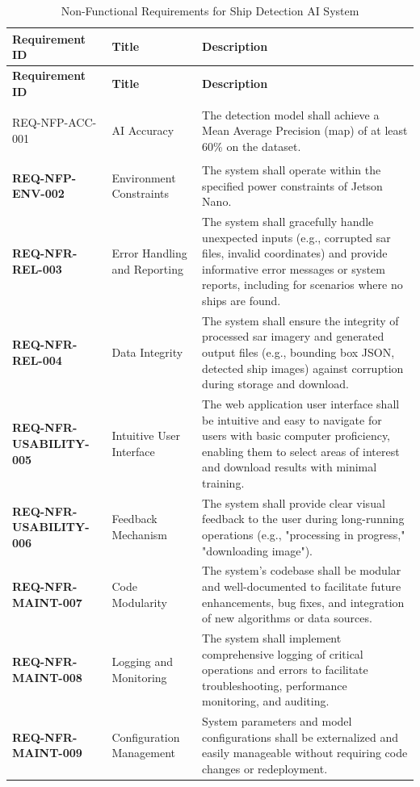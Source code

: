 \documentclass{article}
\begin{document}
\begin{longtable}{>{\bfseries}p{4.5cm}p{3.5cm}p{6.5cm}}
\caption{Non-Functional Requirements for Ship Detection AI System} \\
\hline
\textbf{Requirement ID} & \textbf{Title} & \textbf{Description} \\
\hline
\endfirsthead

\hline
\textbf{Requirement ID} & \textbf{Title} & \textbf{Description} \\
\hline
\endhead

\hline
\endfoot

REQ-NFP-ACC-001 & AI Accuracy & The detection model shall achieve a Mean Average Precision (\acrshort{map}) of at least 60\% on the dataset. \\
REQ-NFP-ENV-002 & Environment Constraints & The system shall operate within the specified power constraints of Jetson Nano. \\
REQ-NFR-REL-003 & Error Handling and Reporting & The system shall gracefully handle unexpected inputs (e.g., corrupted \acrshort{sar} files, invalid coordinates) and provide informative error messages or system reports, including for scenarios where no ships are found. \\
REQ-NFR-REL-004 & Data Integrity & The system shall ensure the integrity of processed \acrshort{sar} imagery and generated output files (e.g., bounding box JSON, detected ship images) against corruption during storage and download. \\
REQ-NFR-USABILITY-005 & Intuitive User Interface & The web application user interface shall be intuitive and easy to navigate for users with basic computer proficiency, enabling them to select areas of interest and download resu\acrshort{lts} with minimal training. \\
REQ-NFR-USABILITY-006 & Feedback Mechanism & The system shall provide clear visual feedback to the user during long-running operations (e.g., "processing in progress," "downloading image"). \\
REQ-NFR-MAINT-007 & Code Modularity & The system's codebase shall be modular and well-documented to facilitate future enhancements, bug fixes, and integration of new algorithms or data sources. \\
REQ-NFR-MAINT-008 & Logging and Monitoring & The system shall implement comprehensive logging of critical operations and errors to facilitate troubleshooting, performance monitoring, and auditing. \\
REQ-NFR-MAINT-009 & Configuration Management & System parameters and model configurations shall be externalized and easily manageable without requiring code changes or redeployment. \\

\end{longtable}
\end{document}
